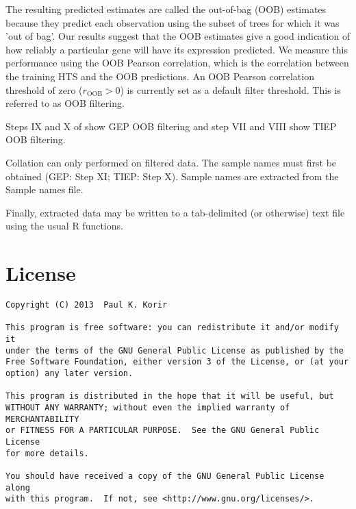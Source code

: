 \documentclass[a4paper,12pt]{article}
\begin{document}
The resulting predicted estimates are called the out-of-bag (OOB) estimates because they predict each observation using the subset of trees for which it was 'out of bag'. Our results suggest that the OOB estimates give a good indication of how reliably a particular gene will have its expression predicted. We measure this performance using the OOB Pearson correlation, which is the correlation between the training HTS and the OOB predictions. An OOB Pearson correlation threshold of zero ($r_{\mathrm{OOB}} > 0$) is currently set as a default filter threshold. This is referred to as OOB filtering.

Steps IX and X of show GEP OOB filtering and step VII and VIII show TIEP OOB filtering.

Collation can only performed on filtered data. The sample names must first be obtained (GEP: Step XI; TIEP: Step X). Sample names are extracted from the Sample names file.

Finally, extracted data may be written to a tab-delimited (or otherwise) text file using the usual R functions.

\section{License}
\begin{verbatim}
Copyright (C) 2013  Paul K. Korir 

This program is free software: you can redistribute it and/or modify it
under the terms of the GNU General Public License as published by the 
Free Software Foundation, either version 3 of the License, or (at your
option) any later version.

This program is distributed in the hope that it will be useful, but 
WITHOUT ANY WARRANTY; without even the implied warranty of MERCHANTABILITY
or FITNESS FOR A PARTICULAR PURPOSE.  See the GNU General Public License 
for more details.

You should have received a copy of the GNU General Public License along 
with this program.  If not, see <http://www.gnu.org/licenses/>.
\end{verbatim}
\end{document}
